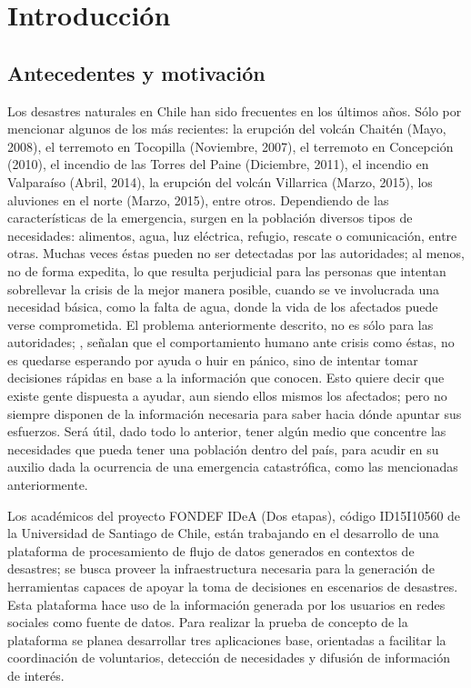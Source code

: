 \chapter{Introducción}
\label{cap:introduccion}

\section{Antecedentes y motivación}
\label{intro:motivacion}

Los desastres naturales en Chile han sido frecuentes en los últimos años. Sólo por mencionar algunos de los más recientes: la erupción del volcán Chaitén (Mayo, 2008), el terremoto en Tocopilla (Noviembre, 2007), el terremoto en Concepción (2010), el incendio de las Torres del Paine (Diciembre, 2011), el incendio en Valparaíso (Abril, 2014), la erupción del volcán Villarrica (Marzo, 2015), los aluviones en el norte (Marzo, 2015), entre otros. Dependiendo de las características de la emergencia, surgen en la población diversos tipos de necesidades: alimentos, agua, luz eléctrica, refugio, rescate o comunicación, entre otras. Muchas veces éstas pueden no ser detectadas por las autoridades; al menos, no de forma expedita, lo que resulta perjudicial para las personas que intentan sobrellevar la crisis de la mejor manera posible, cuando se ve involucrada una necesidad básica, como la falta de agua, donde la vida de los afectados puede verse comprometida. El problema anteriormente descrito, no es sólo para las autoridades; \cite{ChatoSurvey}, señalan que el comportamiento humano ante crisis como éstas, no es quedarse esperando por ayuda o huir en pánico, sino de intentar tomar decisiones rápidas en base a la información que conocen. Esto quiere decir que existe gente dispuesta a ayudar, aun siendo ellos mismos los afectados; pero no siempre disponen de la información necesaria para saber hacia dónde apuntar sus esfuerzos. Será útil, dado todo lo anterior, tener algún medio que concentre las necesidades que pueda tener una población dentro del país, para acudir en su auxilio dada la ocurrencia de una emergencia catastrófica, como las mencionadas anteriormente.

Los académicos del proyecto FONDEF IDeA (Dos etapas), código ID15I10560 de la Universidad de Santiago de Chile, están trabajando en el desarrollo de una plataforma de procesamiento de flujo de datos generados en contextos de desastres; se busca proveer la infraestructura necesaria para la generación de herramientas capaces de apoyar la toma de decisiones en escenarios de desastres. Esta plataforma hace uso de la información generada por los usuarios en redes sociales como fuente de datos. Para realizar la prueba de concepto de la plataforma se planea desarrollar tres aplicaciones base, orientadas a facilitar la coordinación de voluntarios, detección de necesidades y difusión de información de interés.

